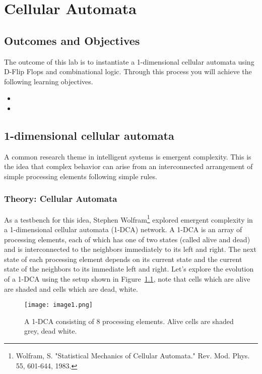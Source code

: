 \chapter{Cellular Automata}
\label{chapter:cellAuto}
\graphicspath{ {./Lab07CellularAutomata/Fig} }

\section{Outcomes and Objectives}

The outcome of this lab is to instantiate a 1-dimensional 
cellular automata using D-Flip Flops and combinational logic.
Through this process you will achieve the following
learning objectives.
\begin{itemize}
	\item {}
	\item {}
\end{itemize}



\section{1-dimensional cellular automata}

A common research theme in intelligent systems is emergent complexity.
This is the idea that complex behavior can arise from an interconnected
arrangement of simple processing elements following simple rules. 

\subsection{Theory: Cellular Automata}
As a testbench for this idea, Stephen Wolfram\footnote{Wolfram, S.
  "Statistical Mechanics of Cellular Automata." Rev. Mod. Phys. 55,
  601-644, 1983.} explored emergent complexity in a 1-dimensional
cellular automata (1-DCA) network. A 1-DCA is an array of processing
elements, each of which has one of two states (called alive and dead)
and is interconnected to the neighbors immediately to its left and
right. The next state of each processing element depends on its current
state and the current state of the neighbors to its immediate left and
right. Let's explore the evolution of a 1-DCA using the setup shown in
Figure~\ref{fig:exampleCA}, note that cells which are alive are shaded and cells which are
dead, white.

\begin{figure}[ht]
\texttt{[image: image1.png]}
\caption{A 1-DCA consisting of 8 processing elements. Alive cells are
shaded grey, dead white.}
\label{fig:exampleCA}
\end{figure}

